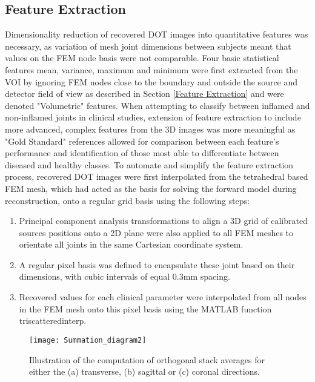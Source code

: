 \documentclass[twoside]{bhamthesis}
\theoremstyle{definition}
\begin{document}
\subsection{Feature Extraction}
\label{Feature Extraction Patient}

Dimensionality reduction of recovered DOT images into quantitative features was necessary, as variation of mesh joint dimensions between subjects meant that values on the FEM node basis were not comparable. Four basic statistical features mean, variance, maximum and minimum were first extracted from the VOI by ignoring FEM nodes close to the boundary and outside the source and detector field of view as described in Section \ref{Feature Extraction} and were denoted "Volumetric" features. When attempting to classify between inflamed and non-inflamed joints in clinical studies, extension of feature extraction to include more advanced, complex features from the 3D images was more meaningful as "Gold Standard" references allowed for comparison between each feature's performance and identification of those most able to differentiate between diseased and healthy classes. To automate and simplify the feature extraction process, recovered DOT images were first interpolated from the tetrahedral based FEM mesh, which had acted as the basis for solving the forward model during reconstruction, onto a regular grid basis using the following steps:

\begin{enumerate}
\item Principal component analysis transformations to align a 3D grid of calibrated sources positions onto a 2D plane were also applied to all FEM meshes to orientate all joints in the same Cartesian coordinate system.
\item A regular pixel basis was defined to encapsulate these joint based on their dimensions, with cubic intervals of equal 0.3mm spacing.
\item Recovered values for each clinical parameter were interpolated from all nodes in the FEM mesh onto this pixel basis using the MATLAB function triscatteredinterp. 
\end{enumerate}

\begin{figure}[!ht]
\centering\texttt{[image: Summation\_diagram2]}
\caption{Illustration of the computation of orthogonal stack averages for either the (a) transverse, (b) sagittal or (c) coronal directions.}
\label{Summation_diagram}
\end{figure}
\end{document}
